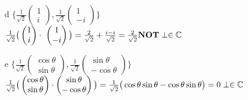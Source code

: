 \documentclass[11 pt]{article}
\theoremstyle{definition}
\theoremstyle{definition}
\begin{document}
\begin{enumerate}
\begin{enumerate}
\item[d] $\{\frac{1}{\sqrt{2}}\left( \begin{matrix} 1\\i \end{matrix} \right), \frac{1}{\sqrt{2}} \left( \begin{matrix}1\\-i \end{matrix} \right) \}$\\
\hspace*{1.2cm}$\frac{1}{\sqrt{2}}\big( \left( \begin{matrix} 1\\i\end{matrix}\right)\cdot\ \left( \begin{matrix}1\\-i\end{matrix} \right) \big) = \frac{2}{\sqrt{2}} + \frac{i-i}{\sqrt{2}} = \frac{2}{\sqrt{2}}\\
\textbf{NOT}\perp\in\mathbb{C}$\\

\item[e] $\{\frac{1}{\sqrt{2}}\left(\begin{matrix}\cos\theta \\ \sin\theta\end{matrix} \right), \frac{1}{\sqrt{2}} \left( \begin{matrix}\sin\theta \\ -\cos\theta \end{matrix} \right)\}$\\
\hspace*{1.2cm} $\frac{1}{\sqrt{2}}\big(\left( \begin{matrix}\cos\theta \\ \sin\theta \end{matrix} \right)\cdot\left( \begin{matrix} \sin\theta \\ -\cos\theta \end{matrix} \right)\big) = \frac{1}{\sqrt{2}}\big( \cos\theta\sin\theta - \cos\theta\sin\theta\big) = 0\\
\perp\in\mathbb{C}$\\


\end{enumerate}
\end{enumerate}
\end{document}
